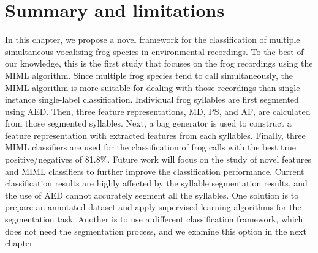 \section{Summary and limitations}
In this chapter, we propose a novel framework for the classification of multiple simultaneous vocalising frog species in environmental recordings. To the best of our knowledge, this is the first study that focuses on the frog recordings using the MIML algorithm. Since multiple frog species tend to call simultaneously, the MIML algorithm is more suitable for dealing with those recordings than single-instance single-label classification. Individual frog syllables are first segmented using AED. Then, three feature representations, MD, PS, and AF, are calculated from those segmented syllables. Next, a bag generator is used to construct a feature representation with extracted features from each syllables. Finally, three MIML classifiers are used for the classification of frog calls with the best true positive/negatives of 81.8\%. Future work will focus on the study of novel features and MIML classifiers to further improve the classification performance. Current classification results are highly affected by the syllable segmentation results, and the use of AED cannot accurately segment all the syllables. One solution is to prepare an annotated dataset and apply supervised learning algorithms for the segmentation task. Another is to use a different classification framework, which does not need the segmentation process, and we examine this option in the next chapter


